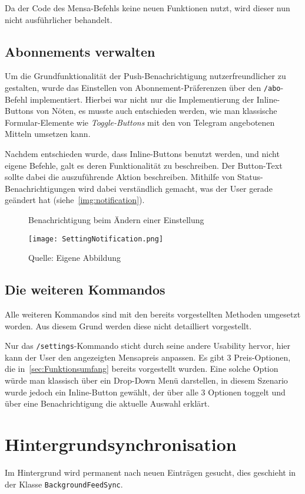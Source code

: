 Da der Code des Mensa-Befehls keine neuen Funktionen nutzt, wird dieser nun nicht ausführlicher behandelt.

\subsection{Abonnements verwalten}
Um die Grundfunktionalität der Push-Benachrichtigung nutzerfreundlicher zu gestalten, wurde das Einstellen von Abonnement-Präferenzen über den \texttt{/abo}-Befehl implementiert. Hierbei war nicht nur die Implementierung der Inline-Buttons von Nöten, es musste auch entschieden werden, wie man klassische Formular-Elemente wie \emph{Toggle-Buttons} mit den von Telegram angebotenen Mitteln umsetzen kann.

Nachdem entschieden wurde, dass Inline-Buttons benutzt werden, und nicht eigene Befehle, galt es deren Funktionalität zu beschreiben. Der Button-Text sollte dabei die auszuführende Aktion beschreiben. Mithilfe von Status-Benachrichtigungen wird dabei verständlich gemacht, was der User gerade geändert hat (siehe~\autoref{img:notification}).

\begin{figure}[!htb]
    \centering
    \caption{Benachrichtigung beim Ändern einer Einstellung}
      \texttt{[image: SettingNotification.png]}
      \label{img:notification}
    \caption*{Quelle: Eigene Abbildung}
\end{figure}

\subsection{Die weiteren Kommandos}
Alle weiteren Kommandos sind mit den bereits vorgestellten Methoden umgesetzt worden. Aus diesem Grund werden diese nicht detailliert vorgestellt.

Nur das \texttt{/settings}-Kommando sticht durch seine andere Usability hervor, hier kann der User den angezeigten Mensapreis anpassen. Es gibt 3 Preis-Optionen, die in~\autoref{sec:Funktionsumfang} bereits vorgestellt wurden. Eine solche Option würde man klassisch über ein Drop-Down Menü darstellen, in diesem Szenario wurde jedoch ein Inline-Button gewählt, der über alle 3 Optionen toggelt und über eine Benachrichtigung die aktuelle Auswahl erklärt.

\section{Hintergrundsynchronisation}
Im Hintergrund wird permanent nach neuen Einträgen gesucht, dies geschieht in der Klasse \texttt{BackgroundFeedSync}.

